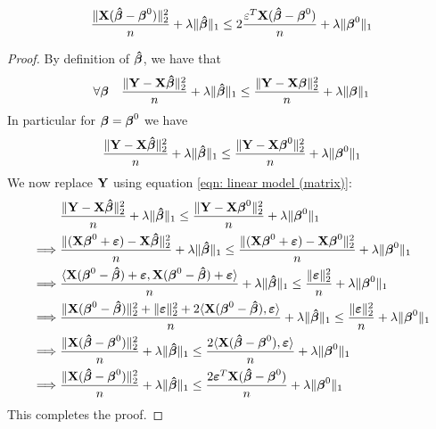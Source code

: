 \begin{lemma}
    $$\frac{\| \X (\btahat-\bta^{0})\|_{2}^{2}}{n} + \lambda\|\btahat\|_{1} \leq 2 \frac{\varepsilon^{T} \X (\btahat-\bta^{0})}{n}+\lambda \| \bta^{0} \|_{1}$$
\end{lemma}
\begin{proof}
    By definition of $\btahat$, we have that
    $$
        \forall \bta \quad \frac{\| \Y-\X \btahat \|_{2}^{2}}{n} + \lambda \| \btahat \|_{1} \leq \frac{\|\Y-\X \bta \|_{2}^{2}}{n}+\lambda \| \bta \|_{1}
    $$
    In particular for $\bta = \bta^0$ we have
    $$
        \frac{\| \Y-\X \btahat \|_{2}^{2}}{n}+\lambda\| \btahat \|_{1} \leq \frac{ \| \Y-\X \bta^0\|_{2}^{2}}{n}+\lambda \| \bta^0\|_{1}
    $$
    We now replace $\Y$ using equation \eqref{eqn: linear model (matrix)}:
    \begin{align*}
                 & \frac{\|\Y  - \X \btahat \|_{2}^{2}}{n} + \lambda \| \btahat\|_{1} \leq \frac{\| \Y  - \X \bta^0 \|_2^2}{n}+\lambda\|\bta^{0}\|_{1}                                                     \\
        \implies &
        \frac{\| (\X \bta^0 + \eps) - \X \btahat \|_{2}^{2}}{n}+\lambda\| \btahat \|_{1} \leq \frac{ \| (\X \bta^0 + \eps)-\X \bta^0\|_{2}^{2}}{n}+\lambda \| \bta^0\|_{1}                                 \\
        \implies &
        \frac{\langle \X ( \bta^0 - \btahat) + \eps, \X ( \bta^0 - \btahat) + \eps \rangle}{n}+\lambda \| \btahat \|_{1} \leq \frac{ \| \eps \|_{2}^{2}}{n}+\lambda \| \bta^0\|_{1}                        \\
        \implies &
        \frac{\| \X (\bta^0 - \btahat) \| _2^2 + \| \eps \|_2^2 + 2 \langle \X ( \bta^0 - \btahat),  \eps \rangle}{n}+\lambda \| \btahat \|_{1} \leq \frac{ \| \eps \|_{2}^{2}}{n}+\lambda \| \bta^0\|_{1} \\
        \implies &
        \frac{\| \X (\btahat - \bta^0) \| _2^2}{n} + \lambda \| \btahat \|_{1} \leq \frac{2 \langle \X ( \btahat - \bta^0),  \eps \rangle}{n} + \lambda \| \bta^0\|_{1}                                    \\
        \implies &
        \frac{\| \X (\btahat - \bta^0) \| _2^2}{n} + \lambda \| \btahat \|_{1} \leq \frac{2 \eps^T \X ( \btahat - \bta^0)}{n} + \lambda \| \bta^0\|_{1}                                                    \\
    \end{align*}
    This completes the proof.
\end{proof}


